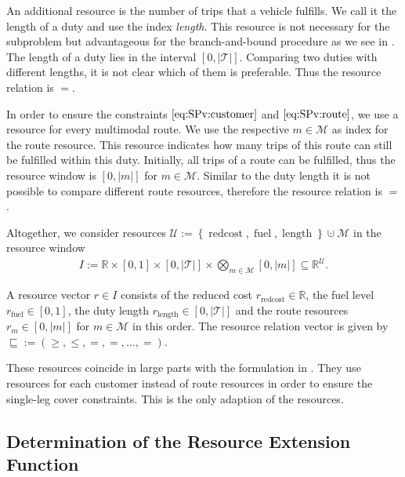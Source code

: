 An additional resource is the number of trips that a vehicle fulfills. We call it the length of a duty and use the index \emph{length}. This resource is not necessary for the subproblem but advantageous for the branch-and-bound procedure as we see in . The length of a duty lies in the interval $[0,|\mathcal{T}|]$. Comparing two duties with different lengths, it is not clear which of them is preferable. Thus the resource relation is $=$.

In order to ensure the constraints $\eqref{eq:SPv:customer}$ and $\eqref{eq:SPv:route}$, we use a resource for every multimodal route. We use the respective $m\in\mathcal{M}$ as index for the route resource. This resource indicates how many trips of this route can still be fulfilled within this duty. Initially, all trips of a route can be fulfilled, thus the resource window is $[0,|m|]$ for $m\in\mathcal{M}$. Similar to the duty length it is not possible to compare different route resources, therefore the resource relation is $=$.

Altogether, we consider resources ${\mathcal{U} := \left\{\operatorname{redcost},\operatorname{fuel},\operatorname{length}\right\}\cupdot\mathcal{M}}$ in the resource window
\begin{align*}
	I := \mathbb{R}\times[0,1]\times[0,|\mathcal{T}|]\times\bigotimes_{m\in\mathcal{M}}[0,|m|]\subseteq\mathbb{R}^{\mathcal{U}}.
\end{align*}

A resource vector $r\in I$ consists of the reduced cost ${r_{\operatorname{redcost}}\in\mathbb{R}}$, the fuel level ${r_{\operatorname{fuel}}\in[0,1]}$, the duty length ${r_{\operatorname{length}}\in[0,|\mathcal{T}|]}$ and the route resources ${r_m\in[0,|m|]}$ for $m\in\mathcal{M}$ in this order. The resource relation vector is given by ${\sqsubseteq := \left(\geq,\leq,=,=,\dots,=\right)}$.

These resources coincide in large parts with the formulation in \cite{Kaiser}. They use resources for each customer instead of route resources in order to ensure the single-leg cover constraints. This is the only adaption of the resources.


\subsection{Determination of the Resource Extension Function}
\label{sec:ref}


